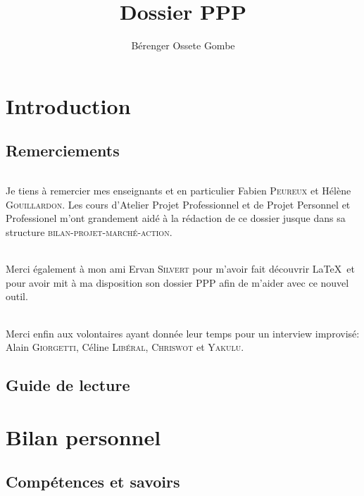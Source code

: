 \documentclass[a4paper,12pt, draft]{report}
\author{Bérenger Ossete Gombe}
\title{Dossier PPP}
\newcommand{\sommaire}{\shorttoc{Sommaire}{1}}
\begin{document}
\maketitle

\newpage
\sommaire{}

\newpage

\part{Introduction}

\chapter{Remerciements}
\paragraph{}
Je tiens à remercier mes enseignants et en particulier Fabien \textsc{Peureux} et Hélène \textsc{Gouillardon}. Les cours d'Atelier Projet Professionnel et de Projet Personnel et Professionel m'ont grandement aidé à la rédaction de ce dossier jusque dans sa structure \textsc{bilan-projet-marché-action}.

\paragraph{}
Merci également à mon ami Ervan \textsc{Silvert} pour m'avoir fait découvrir \LaTeX\ et pour avoir mit à ma disposition son dossier PPP afin de m'aider avec ce nouvel outil.

\paragraph{}
Merci enfin aux volontaires ayant donnée leur temps pour un interview improvisé: Alain \textsc{Giorgetti}, Céline \textsc{Libéral}, \textsc{Chriswot} et \textsc{Yakulu}.

\chapter{Guide de lecture}

\part{Bilan personnel}

\chapter{Compétences et savoirs} 
\end{document}
